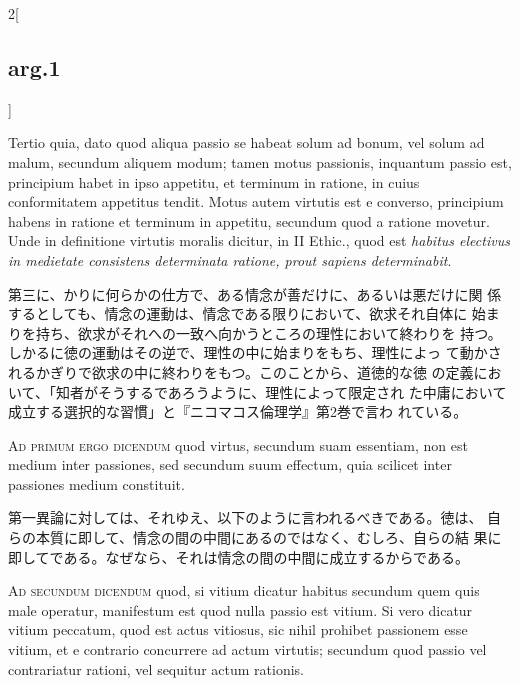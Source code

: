 \documentclass[paper=a4paper,fontsize=10pt,jafontsize=9pt,titlepage]{jlreq}
\begin{document}
\begin{paracol}{2}[\subsection{arg.1}]
\switchcolumn*

Tertio quia, dato quod aliqua passio se habeat solum ad bonum, vel
solum ad malum, secundum aliquem modum; tamen motus passionis,
inquantum passio est, principium habet in ipso appetitu, et terminum
in ratione, in cuius conformitatem appetitus tendit. Motus autem
virtutis est e converso, principium habens in ratione et terminum in
appetitu, secundum quod a ratione movetur. Unde in definitione
virtutis moralis dicitur, in II Ethic., quod est {\itshape habitus
electivus in medietate consistens determinata ratione, prout sapiens
determinabit}.

\switchcolumn

第三に、かりに何らかの仕方で、ある情念が善だけに、あるいは悪だけに関
 係するとしても、情念の運動は、情念である限りにおいて、欲求それ自体に
 始まりを持ち、欲求がそれへの一致へ向かうところの理性において終わりを
 持つ。しかるに徳の運動はその逆で、理性の中に始まりをもち、理性によっ
 て動かされるかぎりで欲求の中に終わりをもつ。このことから、道徳的な徳
 の定義において、「知者がそうするであろうように、理性によって限定され
 た中庸において成立する選択的な習慣」と『ニコマコス倫理学』第2巻で言わ
 れている。

\switchcolumn*[\subsection{ad.1}]

{\scshape Ad primum ergo dicendum} quod virtus, secundum suam
essentiam, non est medium inter passiones, sed secundum suum effectum,
quia scilicet inter passiones medium constituit.

\switchcolumn

第一異論に対しては、それゆえ、以下のように言われるべきである。徳は、
 自らの本質に即して、情念の間の中間にあるのではなく、むしろ、自らの結
 果に即してである。なぜなら、それは情念の間の中間に成立するからである。

\switchcolumn*[\subsection{ad.2}]

{\scshape Ad secundum dicendum} quod, si vitium dicatur habitus
secundum quem quis male operatur, manifestum est quod nulla passio est
vitium. Si vero dicatur vitium peccatum, quod est actus vitiosus, sic
nihil prohibet passionem esse vitium, et e contrario concurrere ad
actum virtutis; secundum quod passio vel contrariatur rationi, vel
sequitur actum rationis.


\end{paracol}
\end{document}

